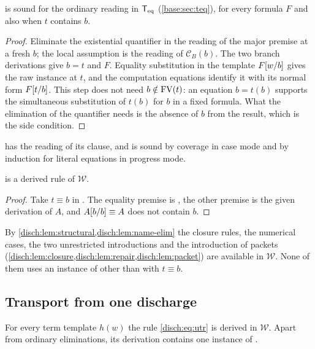 \begin{lemma}
\label{disch:lem:name-sound}
 is sound for the ordinary reading in $\mathsf{T}_{\mathrm{eq}}$
(\cref{base:sec:teq}), for every formula $F$ and also when $t$ contains
$b$.
\end{lemma}

\begin{proof}
Eliminate the existential quantifier in the reading of the major premise
at a fresh $b$; the local assumption is the reading of $\mathcal C_B(b)$.
The two branch derivations give $b=t$ and $F$. Equality substitution in
the template $F[w/b]$ gives the raw instance at $t$, and the
computation equations identify it with its normal form $F[t/b]$.
This step does not need $b\notin\operatorname{FV}(t)$: an equation $b=t(b)$ supports the
simultaneous substitution of $t(b)$ for $b$ in a fixed formula. What the
elimination of the quantifier needs is the absence of $b$ from the result,
which is the side condition.
\end{proof}

 has the reading of its clause, and  is sound
by coverage in case mode and by induction for literal equations in
progress mode.

\begin{lemma}
\label{disch:lem:name-elim}
 is a derived rule of $\mathcal W$.
\end{lemma}

\begin{proof}
Take $t\equiv b$ in . The equality premise is
, the other premise is the given derivation of $A$, and
$A[b/b]\equiv A$ does not contain $b$.
\end{proof}

By \cref{disch:lem:structural,disch:lem:name-elim} the closure rules, the
numerical cases, the two unrestricted introductions and the introduction
of packets
(\cref{disch:lem:closure,disch:lem:repair,disch:lem:packet}) are available
in $\mathcal W$. None of them uses an instance of  other
than with $t\equiv b$.

\subsection{Transport from one discharge}

\begin{theorem}
\label{disch:thm:name-transport}
For every term template $h(w)$ the rule 
\eqref{disch:eq:utr} is derived in $\mathcal W$. Apart from ordinary
eliminations, its derivation contains one instance of .
\end{theorem}

